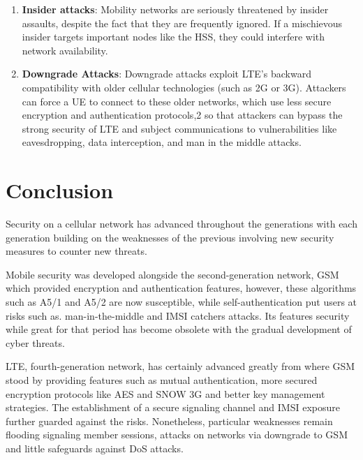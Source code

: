 \documentclass[conference]{IEEEtran}
\begin{document}
\begin{enumerate}
            \item \textbf{Insider attacks}:
            Mobility networks are seriously threatened by insider assaults, despite the fact that they are frequently ignored. If a mischievous insider targets important nodes like the HSS, they could interfere with network availability\cite{cichonski2016guide}. 

            \item \textbf{Downgrade Attacks}:
            Downgrade attacks exploit LTE’s backward compatibility with older cellular technologies (such as 2G or 3G). Attackers can force a UE to connect to these older networks, which use less secure encryption and authentication protocols,2 so that attackers can bypass the strong security of LTE and subject communications to vulnerabilities like eavesdropping, data interception, and man in the middle attacks\cite{cao2013survey}.
 

             
        \end{enumerate}



\section{Conclusion}
Security on a cellular network has advanced throughout the generations with each generation building on the weaknesses of the previous involving new security measures to counter new threats. 

Mobile security was developed alongside the second-generation network, GSM which provided encryption and authentication features, however, these algorithms such as A5/1 and A5/2 are now susceptible, while self-authentication put users at risks such as. man-in-the-middle and IMSI catchers attacks. Its features security while great for that period has become obsolete with the gradual development of cyber threats. \cite{kaur2012review}

LTE, fourth-generation network, has certainly advanced greatly from where GSM stood by providing features such as mutual authentication, more secured encryption protocols like AES and SNOW 3G and better key management strategies. The establishment of a secure signaling channel and IMSI exposure further guarded against the risks. Nonetheless, particular weaknesses remain flooding signaling member sessions, attacks on networks via downgrade to GSM and little safeguards against DoS attacks.
\end{document}
